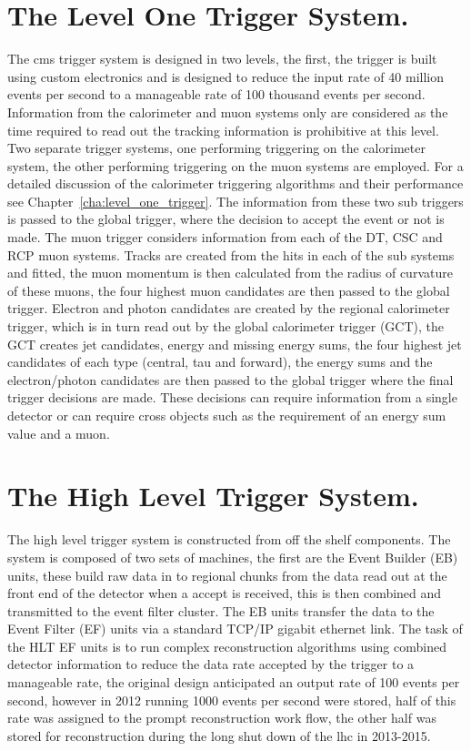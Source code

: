 \section{The Level One Trigger System.} %
\label{sec:the_level_one_trigger_system}
The \ac{cms} trigger system is designed in two levels, the first, the \Lone 
trigger is built using custom electronics and is designed to reduce the input 
rate of 40 million events per second to a manageable rate of 100 thousand 
events per second. Information from the calorimeter and muon systems only are 
considered as the time required to read out the tracking information is 
prohibitive at this level. Two separate trigger systems, one performing 
triggering on the calorimeter system, the other performing triggering on the 
muon systems are employed. For a detailed discussion of the calorimeter 
triggering algorithms and their performance see 
Chapter~\ref{cha:level_one_trigger}. The information from these two sub 
triggers is passed to the global trigger, where the decision to accept the 
event or not is made. 
The muon trigger considers information from each of the DT, CSC and RCP muon 
systems. Tracks are created from the hits in each of the sub systems and 
fitted, the muon momentum is then calculated from the radius of curvature of 
these muons, the four highest \PT muon candidates are then passed to the global 
trigger.
Electron and photon candidates are created by the regional calorimeter trigger, 
which is in turn read out by the global calorimeter trigger (GCT), the GCT 
creates jet candidates, energy and missing energy sums, the four highest \ET 
jet candidates of each type (central, tau and forward), the energy sums and the 
electron/photon candidates are then passed to the global trigger where the 
final trigger decisions are made. These decisions can require information from 
a single detector or can require cross objects such as the requirement of an 
energy sum value and a muon.

\section{The High Level Trigger System.} %
\label{sec:the_high_level_trigger_system}
The high level trigger system is constructed from off the shelf components. 
The system is composed of two sets of machines, the first are the Event Builder 
(EB) units, these build raw data in to regional chunks from the data read out 
at the front end of the detector when a \Lone accept is received, this is then  
combined and transmitted to the event filter cluster. The EB units transfer the 
data to the Event Filter (EF) units via a standard TCP/IP gigabit ethernet link.
The task of the HLT EF units is to run complex reconstruction algorithms using 
combined detector information to reduce the data rate accepted by the \Lone 
trigger to a manageable rate, the original design anticipated an output rate of 
100 events per second, however in 2012 running 1000 events per second were 
stored, half of this rate was assigned to the prompt reconstruction work flow, 
the other half was stored for reconstruction during the long shut down of the 
\ac{lhc} in 2013-2015.

